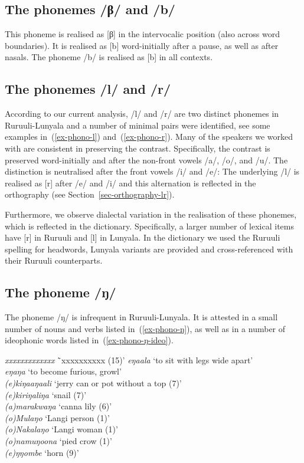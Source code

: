 \subsection{The phonemes /β/ and /b/}  This phoneme is realised as [β] in the intervocalic position (also across word boundaries). 
It is realised as [b] word-initially after a pause, as well as after nasals. 
The phoneme /b/ is realised as [b] in all contexts.


\subsection{The phonemes /l/ and /r/} According to our current analysis, /l/ and /r/ are two distinct phonemes in Ruruuli\hyp{}Lunyala and a number of minimal pairs were identified, see some examples in~(\ref{ex-phono-l}) and~(\ref{ex-phono-r}). 
Many of the speakers we worked with are consistent in preserving the contrast. 
Specifically, the contrast is preserved word-initially and after the non-front vowels /a/, /o/, and /u/. 
The distinction is neutralised after the front vowels /i/ and /e/: 
The underlying /l/ is realised as [r] after /e/ and /i/ and this alternation is reflected in the orthography (see Section~\ref{sec-orthography-lr}).

Furthermore, we observe dialectal variation in the realisation of these phonemes, which is reflected in the dictionary. 
Specifically, a larger number of lexical items have [r] in Ruruuli and [l] in Lunyala. In the dictionary we used the Ruruuli spelling for headwords, Lunyala variants are provided and cross-referenced with their Ruruuli counterparts. 

\subsection{The phoneme /ŋ/}
The phoneme /ŋ/ is infrequent in Ru\-ruu\-li\hyp{}Lu\-nya\-la. 
It is attested in a small number of nouns and verbs listed in~(\ref{ex-phono-ŋ}), as well as in a number of ideophonic words listed in~(\ref{ex-phono-ŋ-ideo}).

\ea \label{ex-phono-ŋ}
\begin{tabbing}
	 \textit{xxxxxxxxxxxxx}  \=`xxxxxxxxxx (15)'\kill
	 \textit{eŋaala} \>`to sit with legs wide apart'\\
	 \textit{eŋaŋa}  \>`to become furious, growl'\\
	 \textit{(e)kiŋaaŋaali} \> `jerry can or pot without a top (7)'\\
	 \textit{(e)kiriŋaliŋa} \> `snail (7)'\\
	 \textit{(a)marakwaŋa} \>`canna lily (6)'\\
	 \textit{(o)Mulaŋo} \>`Langi person (1)'\\
	 \textit{(o)Nakalaŋo} \> `Langi woman (1)'\\
	 \textit{(o)namuŋoona}  \> `pied crow (1)'\\
	 \textit{(e)ŋŋombe} \> `horn (9)'
\end{tabbing}	
\z

